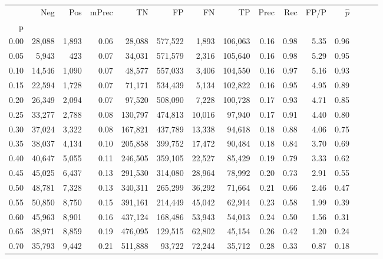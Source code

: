 \begin{tabular}{rrrrrrrrrrrrrrr}
\toprule
{} &     Neg &    Pos & mPrec &       TN &       FP &       FN &       TP &  Prec &   Rec &  FP/P & $\hat{p}$ \\
p    &         &        &       &          &          &          &          &       &       &       &           \\
\midrule
0.00 &  28,088 &  1,893 &  0.06 &   28,088 &  577,522 &    1,893 &  106,063 &  0.16 &  0.98 &  5.35 &      0.96 \\
0.05 &   5,943 &    423 &  0.07 &   34,031 &  571,579 &    2,316 &  105,640 &  0.16 &  0.98 &  5.29 &      0.95 \\
0.10 &  14,546 &  1,090 &  0.07 &   48,577 &  557,033 &    3,406 &  104,550 &  0.16 &  0.97 &  5.16 &      0.93 \\
0.15 &  22,594 &  1,728 &  0.07 &   71,171 &  534,439 &    5,134 &  102,822 &  0.16 &  0.95 &  4.95 &      0.89 \\
0.20 &  26,349 &  2,094 &  0.07 &   97,520 &  508,090 &    7,228 &  100,728 &  0.17 &  0.93 &  4.71 &      0.85 \\
0.25 &  33,277 &  2,788 &  0.08 &  130,797 &  474,813 &   10,016 &   97,940 &  0.17 &  0.91 &  4.40 &      0.80 \\
0.30 &  37,024 &  3,322 &  0.08 &  167,821 &  437,789 &   13,338 &   94,618 &  0.18 &  0.88 &  4.06 &      0.75 \\
0.35 &  38,037 &  4,134 &  0.10 &  205,858 &  399,752 &   17,472 &   90,484 &  0.18 &  0.84 &  3.70 &      0.69 \\
0.40 &  40,647 &  5,055 &  0.11 &  246,505 &  359,105 &   22,527 &   85,429 &  0.19 &  0.79 &  3.33 &      0.62 \\
0.45 &  45,025 &  6,437 &  0.13 &  291,530 &  314,080 &   28,964 &   78,992 &  0.20 &  0.73 &  2.91 &      0.55 \\
0.50 &  48,781 &  7,328 &  0.13 &  340,311 &  265,299 &   36,292 &   71,664 &  0.21 &  0.66 &  2.46 &      0.47 \\
0.55 &  50,850 &  8,750 &  0.15 &  391,161 &  214,449 &   45,042 &   62,914 &  0.23 &  0.58 &  1.99 &      0.39 \\
0.60 &  45,963 &  8,901 &  0.16 &  437,124 &  168,486 &   53,943 &   54,013 &  0.24 &  0.50 &  1.56 &      0.31 \\
0.65 &  38,971 &  8,859 &  0.19 &  476,095 &  129,515 &   62,802 &   45,154 &  0.26 &  0.42 &  1.20 &      0.24 \\
0.70 &  35,793 &  9,442 &  0.21 &  511,888 &   93,722 &   72,244 &   35,712 &  0.28 &  0.33 &  0.87 &      0.18 \\

\end{tabular}
